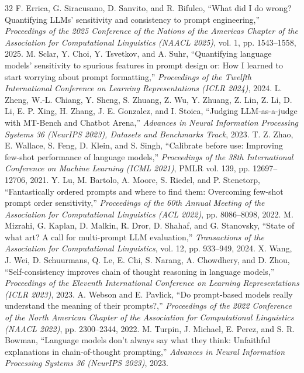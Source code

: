 \documentclass[10pt, conference, letterpaper]{IEEEtran}
\begin{document}
\begin{thebibliography}{32}
 F. Errica, G. Siracusano, D. Sanvito, and R. Bifulco, ``What did I do wrong? Quantifying LLMs' sensitivity and consistency to prompt engineering,'' \textit{Proceedings of the 2025 Conference of the Nations of the Americas Chapter of the Association for Computational Linguistics (NAACL 2025)}, vol. 1, pp. 1543--1558, 2025.
 M. Sclar, Y. Choi, Y. Tsvetkov, and A. Suhr, ``Quantifying language models' sensitivity to spurious features in prompt design or: How I learned to start worrying about prompt formatting,'' \textit{Proceedings of the Twelfth International Conference on Learning Representations (ICLR 2024)}, 2024.
 L. Zheng, W.-L. Chiang, Y. Sheng, S. Zhuang, Z. Wu, Y. Zhuang, Z. Lin, Z. Li, D. Li, E. P. Xing, H. Zhang, J. E. Gonzalez, and I. Stoica, ``Judging LLM-as-a-judge with MT-Bench and Chatbot Arena,'' \textit{Advances in Neural Information Processing Systems 36 (NeurIPS 2023), Datasets and Benchmarks Track}, 2023.
 T. Z. Zhao, E. Wallace, S. Feng, D. Klein, and S. Singh, ``Calibrate before use: Improving few-shot performance of language models,'' \textit{Proceedings of the 38th International Conference on Machine Learning (ICML 2021)}, PMLR vol. 139, pp. 12697--12706, 2021.
 Y. Lu, M. Bartolo, A. Moore, S. Riedel, and P. Stenetorp, ``Fantastically ordered prompts and where to find them: Overcoming few-shot prompt order sensitivity,'' \textit{Proceedings of the 60th Annual Meeting of the Association for Computational Linguistics (ACL 2022)}, pp. 8086--8098, 2022.
 M. Mizrahi, G. Kaplan, D. Malkin, R. Dror, D. Shahaf, and G. Stanovsky, ``State of what art? A call for multi-prompt LLM evaluation,'' \textit{Transactions of the Association for Computational Linguistics}, vol. 12, pp. 933--949, 2024.
 X. Wang, J. Wei, D. Schuurmans, Q. Le, E. Chi, S. Narang, A. Chowdhery, and D. Zhou, ``Self-consistency improves chain of thought reasoning in language models,'' \textit{Proceedings of the Eleventh International Conference on Learning Representations (ICLR 2023)}, 2023.
 A. Webson and E. Pavlick, ``Do prompt-based models really understand the meaning of their prompts?,'' \textit{Proceedings of the 2022 Conference of the North American Chapter of the Association for Computational Linguistics (NAACL 2022)}, pp. 2300--2344, 2022.
 M. Turpin, J. Michael, E. Perez, and S. R. Bowman, ``Language models don't always say what they think: Unfaithful explanations in chain-of-thought prompting,'' \textit{Advances in Neural Information Processing Systems 36 (NeurIPS 2023)}, 2023.

\end{thebibliography}
\end{document}
